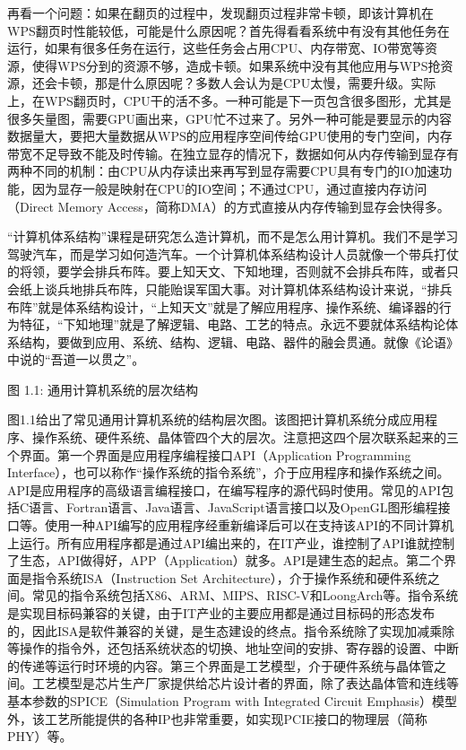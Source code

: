 \documentclass[]{ctexbook}
\begin{document}
再看一个问题：如果在翻页的过程中，发现翻页过程非常卡顿，即该计算机在WPS翻页时性能较低，可能是什么原因呢？首先得看看系统中有没有其他任务在运行，如果有很多任务在运行，这些任务会占用CPU、内存带宽、IO带宽等资源，使得WPS分到的资源不够，造成卡顿。如果系统中没有其他应用与WPS抢资源，还会卡顿，那是什么原因呢？多数人会认为是CPU太慢，需要升级。实际上，在WPS翻页时，CPU干的活不多。一种可能是下一页包含很多图形，尤其是很多矢量图，需要GPU画出来，GPU忙不过来了。另外一种可能是要显示的内容数据量大，要把大量数据从WPS的应用程序空间传给GPU使用的专门空间，内存带宽不足导致不能及时传输。在独立显存的情况下，数据如何从内存传输到显存有两种不同的机制：由CPU从内存读出来再写到显存需要CPU具有专门的IO加速功能，因为显存一般是映射在CPU的IO空间；不通过CPU，通过直接内存访问（Direct Memory Access，简称DMA）的方式直接从内存传输到显存会快得多。

``计算机体系结构''课程是研究怎么造计算机，而不是怎么用计算机。我们不是学习驾驶汽车，而是学习如何造汽车。一个计算机体系结构设计人员就像一个带兵打仗的将领，要学会排兵布阵。要上知天文、下知地理，否则就不会排兵布阵，或者只会纸上谈兵地排兵布阵，只能贻误军国大事。对计算机体系结构设计来说，``排兵布阵''就是体系结构设计，``上知天文''就是了解应用程序、操作系统、编译器的行为特征，``下知地理''就是了解逻辑、电路、工艺的特点。永远不要就体系结构论体系结构，要做到应用、系统、结构、逻辑、电路、器件的融会贯通。就像《论语》中说的``吾道一以贯之''。

图 1.1: 通用计算机系统的层次结构

图1.1给出了常见通用计算机系统的结构层次图。该图把计算机系统分成应用程序、操作系统、硬件系统、晶体管四个大的层次。注意把这四个层次联系起来的三个界面。第一个界面是应用程序编程接口API（Application Programming Interface），也可以称作``操作系统的指令系统''，介于应用程序和操作系统之间。API是应用程序的高级语言编程接口，在编写程序的源代码时使用。常见的API包括C语言、Fortran语言、Java语言、JavaScript语言接口以及OpenGL图形编程接口等。使用一种API编写的应用程序经重新编译后可以在支持该API的不同计算机上运行。所有应用程序都是通过API编出来的，在IT产业，谁控制了API谁就控制了生态，API做得好，APP（Application）就多。API是建生态的起点。第二个界面是指令系统ISA（Instruction Set Architecture），介于操作系统和硬件系统之间。常见的指令系统包括X86、ARM、MIPS、RISC-V和LoongArch等。指令系统是实现目标码兼容的关键，由于IT产业的主要应用都是通过目标码的形态发布的，因此ISA是软件兼容的关键，是生态建设的终点。指令系统除了实现加减乘除等操作的指令外，还包括系统状态的切换、地址空间的安排、寄存器的设置、中断的传递等运行时环境的内容。第三个界面是工艺模型，介于硬件系统与晶体管之间。工艺模型是芯片生产厂家提供给芯片设计者的界面，除了表达晶体管和连线等基本参数的SPICE（Simulation Program with Integrated Circuit Emphasis）模型外，该工艺所能提供的各种IP也非常重要，如实现PCIE接口的物理层（简称PHY）等。
\end{document}
